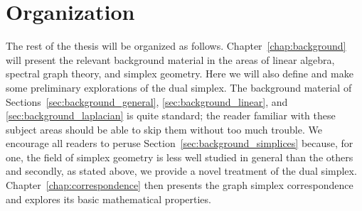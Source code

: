 \section{Organization}
\label{sec:intro_organization}

The rest of the thesis will be  organized as follows. Chapter~\ref{chap:background} will present the relevant background material in the areas of linear algebra, spectral graph theory, and simplex  geometry. Here we will also define and make some preliminary explorations of the dual simplex. The  background material  of Sections~\ref{sec:background_general}, \ref{sec:background_linear},  and \ref{sec:background_laplacian} is quite standard; the reader familiar with  these subject areas should  be able to skip  them without too much trouble. We  encourage all readers to peruse Section~\ref{sec:background_simplices} because, for one, the field  of simplex geometry is  less  well  studied  in general than the others and secondly, as stated above, we provide a novel treatment of  the dual simplex. Chapter~\ref{chap:correspondence} then presents the  graph  simplex correspondence and explores its  basic mathematical properties.  









     

  	
